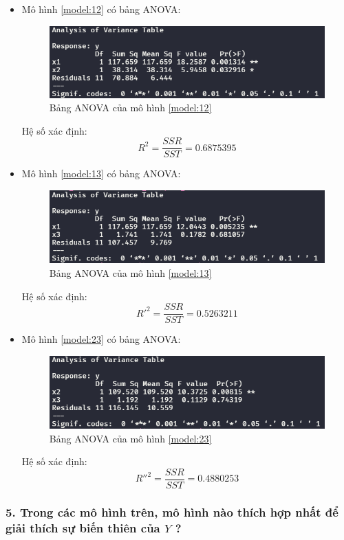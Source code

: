 \documentclass[a4paper]{article}
\theoremstyle{nonumberplain}
\begin{document}
\begin{itemize}
	\item Mô hình \ref{model:12} có bảng ANOVA:
	\begin{figure}[h]
		\centering
		\includegraphics[width=0.7\linewidth]{bai-3-5-anova-1}
		\caption{Bảng ANOVA của mô hình \ref{model:12}}
		\label{fig:bai-3-5-anova-1}
	\end{figure}
	
	Hệ số xác định:
	\[R^2 = \dfrac{SSR}{SST} = 0.6875395\]
	
	\item Mô hình \ref{model:13} có bảng ANOVA:
	\begin{figure}[h]
		\centering
		\includegraphics[width=0.7\linewidth]{bai-3-5-anova-2}
		\caption{Bảng ANOVA của mô hình \ref{model:13}}
		\label{fig:bai-3-5-anova-2}
	\end{figure}
	
	Hệ số xác định:
	\[R'^2 = \dfrac{SSR}{SST} = 0.5263211\]
	
	\item Mô hình \ref{model:23} có bảng ANOVA:
	\begin{figure}[h]
		\centering
		\includegraphics[width=0.7\linewidth]{bai-3-5-anova-3}
		\caption{Bảng ANOVA của mô hình \ref{model:23}}
		\label{fig:bai-3-5-anova-3}
	\end{figure}
	
	Hệ số xác định:
	\[R''^2 = \dfrac{SSR}{SST} = 0.4880253\]
\end{itemize}


\subsubsection*{5. Trong các mô hình trên, mô hình nào thích hợp nhất để giải thích sự biến thiên của $Y$ ?}
\end{document}
